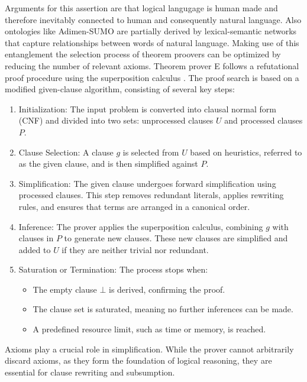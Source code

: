 \documentclass[english,version-2020-11]{uzl-thesis}
\begin{document}
Arguments for this assertion are that logical langugage is human made and therefore inevitably connected to human and consequently natural language.
Also ontologies like Adimen-SUMO are partially derived by lexical-semantic networks that capture relationships between words of natural language.
Making use of this entanglement the selection process of theorem proovers can be optimized by reducing the number of relevant axioms.
Theorem prover E follows a refutational proof procedure using the superposition calculus \cite{Schulz2019}. The proof search is based on a modified given-clause algorithm, consisting of several key steps:

\begin{enumerate}
    \item Initialization: The input problem is converted into clausal normal form (CNF) and divided into two sets: unprocessed clauses \( U \) and processed clauses \( P \).
    \item Clause Selection: A clause \( g \) is selected from \( U \) based on heuristics, referred to as the given clause, and is then simplified against \( P \).
    \item Simplification: The given clause undergoes forward simplification using processed clauses. This step removes redundant literals, applies rewriting rules, and ensures that terms are arranged in a canonical order.
    \item Inference: The prover applies the superposition calculus, combining \( g \) with clauses in \( P \) to generate new clauses. These new clauses are simplified and added to \( U \) if they are neither trivial nor redundant.
    \item Saturation or Termination: The process stops when:
    \begin{itemize}
        \item The empty clause \( \bot \) is derived, confirming the proof.
        \item The clause set is saturated, meaning no further inferences can be made.
        \item A predefined resource limit, such as time or memory, is reached.
    \end{itemize}
\end{enumerate}

Axioms play a crucial role in simplification. While the prover cannot arbitrarily discard axioms, as they form the foundation of logical reasoning, they are essential for clause rewriting and subsumption.
\end{document}
